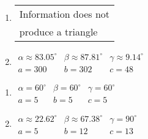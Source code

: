 \begin{multicols}{2} 

\begin{enumerate}

\setcounter{enumi}{\value{HW}}

\item \begin{tabular}{l}
Information does not \\
produce a triangle \end{tabular}

\item $\begin{array}{lll}
\alpha \approx 83.05^{\circ} & \beta \approx 87.81^{\circ} & \gamma \approx 9.14^{\circ} \\
a = 300 & b = 302 & c = 48 \end{array}$

\setcounter{HW}{\value{enumi}}

\end{enumerate}

\end{multicols}

\begin{multicols}{2} 

\begin{enumerate}

\setcounter{enumi}{\value{HW}}

\item $\begin{array}{lll}
\alpha = 60^{\circ} & \beta = 60^{\circ} & \gamma = 60^{\circ} \\
a = 5 & b = 5 & c = 5 \end{array}$

\item $\begin{array}{lll}
\alpha \approx 22.62^{\circ} & \beta \approx 67.38^{\circ} & \gamma = 90^{\circ} \\
a = 5 & b = 12 & c = 13 \end{array}$

\setcounter{HW}{\value{enumi}}

\end{enumerate}

\end{multicols}

